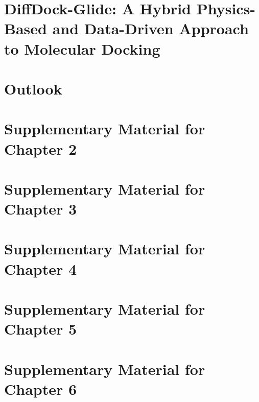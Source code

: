 \documentclass[12pt]{report}
\begin{document}
\chapter{DiffDock-Glide: A Hybrid Physics-Based and Data-Driven Approach to Molecular Docking}


\chapter{Outlook}


\appendix

\chapter{Supplementary Material for Chapter 2}
\label{ch2:appendix}


\chapter{Supplementary Material for Chapter 3}
\label{ch3:appendix}


\chapter{Supplementary Material for Chapter 4}
\label{ch4:appendix}


\chapter{Supplementary Material for Chapter 5}
\label{ch5:appendix}


\chapter{Supplementary Material for Chapter 6}
\label{ch6:appendix}


\begingroup
\singlespacing
\clearpage
{}
{}


\endgroup
\end{document}
